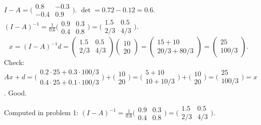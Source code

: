 \begin{solutions}
  \item $I - A = \bigl(\begin{smallmatrix} 0.8 & -0.3 \\ -0.4 & 0.9 \end{smallmatrix}\bigr)$.
        $\det = 0.72 - 0.12 = 0.6$.
        $(I - A)^{-1} = \tfrac{1}{0.6}\bigl(\begin{smallmatrix} 0.9 & 0.3 \\ 0.4 & 0.8 \end{smallmatrix}\bigr) = \bigl(\begin{smallmatrix} 1.5 & 0.5 \\ 2/3 & 4/3 \end{smallmatrix}\bigr)$.
        \[
        x = (I - A)^{-1} d = \begin{pmatrix} 1.5 & 0.5 \\ 2/3 & 4/3 \end{pmatrix} \begin{pmatrix} 10 \\ 20 \end{pmatrix} = \begin{pmatrix} 15 + 10 \\ 20/3 + 80/3 \end{pmatrix} = \begin{pmatrix} 25 \\ 100/3 \end{pmatrix}.
        \]
        Check:
        $A x + d = \bigl(\begin{smallmatrix} 0.2 \cdot 25 + 0.3 \cdot 100/3 \\ 0.4 \cdot 25 + 0.1 \cdot 100/3 \end{smallmatrix}\bigr) + \bigl(\begin{smallmatrix} 10 \\ 20 \end{smallmatrix}\bigr) = \bigl(\begin{smallmatrix} 5 + 10 \\ 10 + 10/3 \end{smallmatrix}\bigr) + \bigl(\begin{smallmatrix} 10 \\ 20 \end{smallmatrix}\bigr) = \bigl(\begin{smallmatrix} 25 \\ 100/3 \end{smallmatrix}\bigr) = x$.
        Good.

  \item Computed in problem 1:
        $(I - A)^{-1} = \tfrac{1}{0.6}\bigl(\begin{smallmatrix} 0.9 & 0.3 \\ 0.4 & 0.8 \end{smallmatrix}\bigr) = \bigl(\begin{smallmatrix} 1.5 & 0.5 \\ 2/3 & 4/3 \end{smallmatrix}\bigr)$.


\end{solutions}
